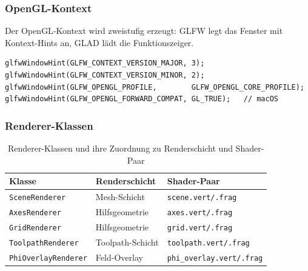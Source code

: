             \subsubsection{OpenGL-Kontext}\label{subsubsec:impl-medusa-opengl-context}
                Der \ac{OpenGL}-Kontext wird zweistufig erzeugt: GLFW legt das Fenster mit Kontext-Hints an, GLAD lädt die Funktionszeiger.

                \begin{lstlisting}[style=cppStyle, caption={GLFW-Kontext-Hints für einheitliches OpenGL-Profil.}, label={lst:impl-medusa-glfw-hints}]
glfwWindowHint(GLFW_CONTEXT_VERSION_MAJOR, 3);
glfwWindowHint(GLFW_CONTEXT_VERSION_MINOR, 2);
glfwWindowHint(GLFW_OPENGL_PROFILE,        GLFW_OPENGL_CORE_PROFILE);
glfwWindowHint(GLFW_OPENGL_FORWARD_COMPAT, GL_TRUE);   // macOS
                \end{lstlisting}

            \subsubsection{Renderer-Klassen}\label{subsubsec:impl-medusa-renderer-classes}
                \begin{table}[ht]
                    \centering
                    \caption[Renderer-Klassen des Graphics-Moduls]{%
                        Renderer-Klassen und ihre Zuordnung zu Renderschicht und Shader-Paar
                    }
                    \label{tab:impl-medusa-renderers}
                    \renewcommand{\arraystretch}{1.2}
                    \begin{tabular}{@{} l l l @{}}
                        \toprule
                        \textbf{Klasse} & \textbf{Renderschicht} & \textbf{Shader-Paar} \\
                        \midrule
                        \texttt{SceneRenderer}        & Mesh-Schicht           & \texttt{scene.vert/.frag} \\
                        \texttt{AxesRenderer}         & Hilfsgeometrie         & \texttt{axes.vert/.frag} \\
                        \texttt{GridRenderer}         & Hilfsgeometrie         & \texttt{grid.vert/.frag} \\
                        \texttt{ToolpathRenderer}     & Toolpath-Schicht       & \texttt{toolpath.vert/.frag} \\
                        \texttt{PhiOverlayRenderer}   & Feld-Overlay           & \texttt{phi\_overlay.vert/.frag} \\
                        \bottomrule
                    \end{tabular}
                \end{table}

